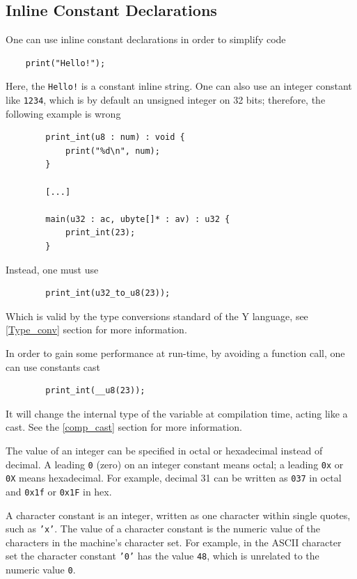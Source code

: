 \documentclass{scrartcl}
\begin{document}
        \subsection{Inline Constant Declarations}
            One can use inline constant declarations in order to simplify code
            \begin{lstlisting}
    print("Hello!");
            \end{lstlisting}
            Here, the \texttt{Hello!} is a constant inline string. One can also
            use an integer constant like \texttt{1234}, which is by default an
            unsigned integer on 32 bits; therefore, the following example is wrong
            \begin{lstlisting}
        print_int(u8 : num) : void {
            print("%d\n", num);
        }

        [...]

        main(u32 : ac, ubyte[]* : av) : u32 {
            print_int(23);
        }
            \end{lstlisting}
            Instead, one must use
            \begin{lstlisting}
        print_int(u32_to_u8(23));
            \end{lstlisting}
            Which is valid by the type conversions standard of the Y language, see
            \ref{Type_conv} section for more information.

            In order to gain some performance at run-time, by avoiding a function call,
            one can use constants cast
            \begin{lstlisting}
        print_int(__u8(23));
            \end{lstlisting}
            It will change the internal type of the variable at compilation time,
            acting like a cast. See the \ref{comp_cast} section for more information.

            The value of an integer can be specified in octal or hexadecimal
            instead of decimal. A leading \texttt{0} (zero) on an integer
            constant means octal; a leading \texttt{0x} or \texttt{0X} means
            hexadecimal.  For example, decimal 31 can be written as
            \texttt{037} in octal and \texttt{0x1f} or \texttt{0x1F} in hex.

            A character constant is an integer, written as one character within
            single quotes, such as \texttt{'x'}. The value of a character constant
            is the numeric value of the characters in the machine's character set.
            For example, in the ASCII character set the character constant \texttt{'0'}
            has the value \texttt{48}, which is unrelated to the numeric value \texttt{0}.
\end{document}
